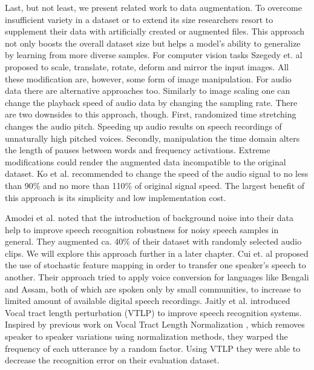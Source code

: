 Last, but not least, we present related work to data augmentation. To overcome insufficient variety in a dataset or to extend its size researchers resort to supplement their data with artificially created or augmented files. This approach not only boosts the overall dataset size but helps a model's ability to generalize by learning from more diverse samples. For computer vision tasks Szegedy et. al\cite{szegedy2015going} proposed to scale, translate, rotate, deform and mirror the input images. All these modification are, however, some form of image manipulation. For audio data there are alternative approaches too. Similarly to image scaling one can change the playback speed of audio data by changing the sampling rate. There are two downsides to this approach, though. First, randomized time stretching changes the audio pitch. Speeding up audio results on speech recordings of unnaturally high pitched voices. Secondly, manipulation the time domain alters the length of pauses between words and frequency activations. Extreme modifications could render the augmented data incompatible to the original dataset. Ko et al.\cite{ko2015audio}  recommended to change the speed of the audio signal to no less than 90\% and no more than 110\% of original signal speed. The largest benefit of this approach is its simplicity and low implementation cost.

Amodei et al.\cite{amodei2015deep} noted that the introduction of background noise into their data help to improve speech recognition robustness for noisy speech samples in general. They augmented ca. 40\% of their dataset with randomly selected audio clips. We will explore this approach further in a later chapter. Cui et. al\cite{cui2015data} proposed the use of stochastic feature mapping in order to transfer one speaker's speech to another. Their approach tried to apply voice conversion for languages like Bengali and Assam, both of which are spoken only by small communities, to increase to limited amount of available digital speech recordings. 
Jaitly et al.\cite{jaitly2013vocal} introduced Vocal tract length perturbation (VTLP) to improve speech recognition systems. Inspired by previous work on Vocal Tract Length Normalization \cite{eide1996parametric}, which removes speaker to speaker variations using normalization methods, they warped the frequency of each utterance by a random factor. Using VTLP they were able to decrease the recognition error on their evaluation dataset.

       
